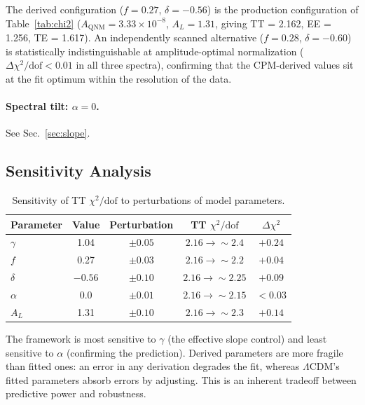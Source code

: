 \documentclass[aps,prd,twocolumn,superscriptaddress,showpacs,preprintnumbers,amsmath,amssymb,nofootinbib]{revtex4-2}
\newcommand{\lcdm}{$\Lambda$CDM}
\begin{document}
The derived configuration ($f = 0.27$, $\delta = -0.56$) is the production configuration of Table~\ref{tab:chi2} ($A_\mathrm{QNM} = 3.33 \times 10^{-8}$, $A_L = 1.31$, giving TT = 2.162, EE = 1.256, TE = 1.617). An independently scanned alternative ($f = 0.28$, $\delta = -0.60$) is statistically indistinguishable at amplitude-optimal normalization ($\Delta\chi^2/\mathrm{dof} < 0.01$ in all three spectra), confirming that the CPM-derived values sit at the fit optimum within the resolution of the data.

\paragraph{Spectral tilt: $\alpha = 0$.} See Sec.~\ref{sec:slope}.


\subsection{Sensitivity Analysis}
\label{sec:sensitivity}

\begin{table}[t]
\caption{\label{tab:sensitivity}Sensitivity of TT $\chi^2/\mathrm{dof}$ to perturbations of model parameters.}
\begin{ruledtabular}
\begin{tabular}{lcccc}
Parameter & Value & Perturbation & TT $\chi^2/\mathrm{dof}$ & $\Delta\chi^2$ \\
\hline
$\gamma$ & 1.04 & $\pm 0.05$ & $2.16 \to {\sim}2.4$ & $+0.24$ \\
$f$ & 0.27 & $\pm 0.03$ & $2.16 \to {\sim}2.2$ & $+0.04$ \\
$\delta$ & $-0.56$ & $\pm 0.10$ & $2.16 \to {\sim}2.25$ & $+0.09$ \\
$\alpha$ & 0.0 & $\pm 0.01$ & $2.16 \to {\sim}2.15$ & $< 0.03$ \\
$A_L$ & 1.31 & $\pm 0.10$ & $2.16 \to {\sim}2.3$ & $+0.14$ \\
\end{tabular}
\end{ruledtabular}
\end{table}

The framework is most sensitive to $\gamma$ (the effective slope control) and least sensitive to $\alpha$ (confirming the prediction). Derived parameters are more fragile than fitted ones: an error in any derivation degrades the fit, whereas \lcdm's fitted parameters absorb errors by adjusting. This is an inherent tradeoff between predictive power and robustness.
\end{document}
